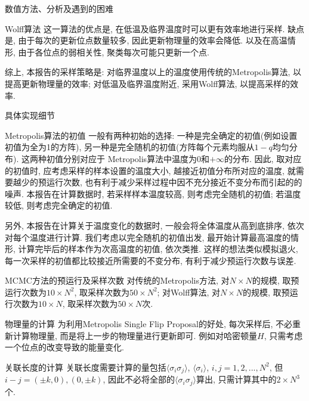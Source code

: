 \documentclass{article}
\begin{document}
\begin{section}{数值方法、分析及遇到的困难}
\begin{subsection}{Wolff算法}
        这一算法的优点是, 在低温及临界温度时可以更有效率地进行采样. 缺点是, 由于每次的更新位点数量较多, 因此更新物理量的效率会降低. 以及在高温情形, 由于各位点的弱相关性, 聚类每次可能只更新一个点. 
    \end{subsection}
    
    综上, 本报告的采样策略是: 对临界温度以上的温度使用传统的Metropolis算法, 以提高更新物理量的效率; 对低温及临界温度附近, 采用Wolff算法, 以提高采样的效率.

\end{section}
\begin{section}{具体实现细节}
    \begin{subsection}{Metropolis算法的初值}
        一般有两种初始的选择: 一种是完全确定的初值(例如设置初值为全为1的方阵), 另一种是完全随机的初值(方阵每个元素均服从$1-q$均匀分布). 这两种初值分别对应于
        Metropolis算法中温度为0和$+\infty$的分布. 因此, 取对应的初值时, 应考虑采样的样本设置的温度大小, 越接近初值分布所对应的温度, 就需要越少的预运行次数, 也有利于减少采样过程中因不充分接近不变分布而引起的的噪声. 
        本报告在计算数据时, 若采样样本温度较高, 则考虑完全随机的初值; 若温度较低, 则考虑完全确定的初值.

        另外, 本报告在计算关于温度变化的数据时, 一般会将全体温度从高到底排序, 依次对每个温度进行计算. 我们考虑以完全随机的初值出发, 最开始计算最高温度的情形, 计算完毕后的样本作为次高温度的初值, 依次类推. 这样的想法类似模拟退火, 
        每一次采样的初值都比较接近所需要的不变分布, 有利于减少预运行次数与误差.
    \end{subsection}
    \begin{subsection}{MCMC方法的预运行及采样次数}
        对传统的Metropolis方法, 对$N\times N$的规模, 取预运行次数为$10\times N^2$, 取采样次数为$50\times N^2$;
        对Wolff算法, 对$N\times N$的规模, 取预运行次数为$10\times N$, 取采样次数为$50\times N$次.
    \end{subsection}
    \begin{subsection}{物理量的计算}
        为利用Metropolis Single Flip Proposal的好处, 每次采样后, 不必重新计算物理量, 而是将上一步的物理量进行更新即可. 例如对哈密顿量$H$, 
        只需考虑一个位点的改变导致的能量变化.
    \end{subsection}
    \begin{subsection}{关联长度的计算}
        关联长度需要计算的量包括$\langle\sigma_i\sigma_j\rangle$, $\langle\sigma_i\rangle$, $i,j=1,2,...,N^2$, 但$i-j=(\pm k,0),(0,\pm k)$,
        因此不必将全部的$\langle\sigma_i\sigma_j\rangle$算出, 只需计算其中的$2\times N^3$个.
    \end{subsection}
    
\end{section}
\end{document}
